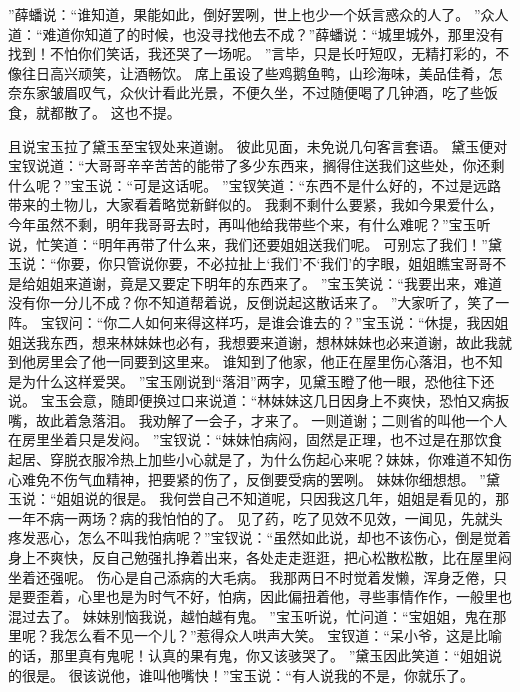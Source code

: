 ”薛蟠说：“谁知道，果能如此，倒好罢咧，世上也少一个妖言惑众的人了。
”众人道：“难道你知道了的时候，也没寻找他去不成？”薛蟠说：“城里城外，那里没有找到！不怕你们笑话，我还哭了一场呢。
”言毕，只是长吁短叹，无精打彩的，不像往日高兴顽笑，让酒畅饮。
席上虽设了些鸡鹅鱼鸭，山珍海味，美品佳肴，怎奈东家皱眉叹气，众伙计看此光景，不便久坐，不过随便喝了几钟酒，吃了些饭食，就都散了。
这也不提。
\par
且说宝玉拉了黛玉至宝钗处来道谢。
彼此见面，未免说几句客言套语。
黛玉便对宝钗说道：“大哥哥辛辛苦苦的能带了多少东西来，搁得住送我们这些处，你还剩什么呢？”宝玉说：“可是这话呢。
”宝钗笑道：“东西不是什么好的，不过是远路带来的土物儿，大家看着略觉新鲜似的。
我剩不剩什么要紧，我如今果爱什么，今年虽然不剩，明年我哥哥去时，再叫他给我带些个来，有什么难呢？”宝玉听说，忙笑道：“明年再带了什么来，我们还要姐姐送我们呢。
可别忘了我们！”黛玉说：“你要，你只管说你要，不必拉扯上‘我们’不‘我们’的字眼，姐姐瞧宝哥哥不是给姐姐来道谢，竟是又要定下明年的东西来了。
”宝玉笑说：“我要出来，难道没有你一分儿不成？你不知道帮着说，反倒说起这散话来了。
”大家听了，笑了一阵。
宝钗问：“你二人如何来得这样巧，是谁会谁去的？”宝玉说：“休提，我因姐姐送我东西，想来林妹妹也必有，我想要来道谢，想林妹妹也必来道谢，故此我就到他房里会了他一同要到这里来。
谁知到了他家，他正在屋里伤心落泪，也不知是为什么这样爱哭。
”宝玉刚说到“落泪”两字，见黛玉瞪了他一眼，恐他往下还说。
宝玉会意，随即便换过口来说道：“林妹妹这几日因身上不爽快，恐怕又病扳嘴，故此着急落泪。
我劝解了一会子，才来了。
一则道谢；二则省的叫他一个人在房里坐着只是发闷。
”宝钗说：“妹妹怕病闷，固然是正理，也不过是在那饮食起居、穿脱衣服冷热上加些小心就是了，为什么伤起心来呢？妹妹，你难道不知伤心难免不伤气血精神，把要紧的伤了，反倒要受病的罢咧。
妹妹你细想想。
”黛玉说：“姐姐说的很是。
我何尝自己不知道呢，只因我这几年，姐姐是看见的，那一年不病一两场？病的我怕怕的了。
见了药，吃了见效不见效，一闻见，先就头疼发恶心，怎么不叫我怕病呢？”宝钗说：“虽然如此说，却也不该伤心，倒是觉着身上不爽快，反自己勉强扎挣着出来，各处走走逛逛，把心松散松散，比在屋里闷坐着还强呢。
伤心是自己添病的大毛病。
我那两日不时觉着发懒，浑身乏倦，只是要歪着，心里也是为时气不好，怕病，因此偏扭着他，寻些事情作作，一般里也混过去了。
妹妹别恼我说，越怕越有鬼。
”宝玉听说，忙问道：“宝姐姐，鬼在那里呢？我怎么看不见一个儿？”惹得众人哄声大笑。
宝钗道：“呆小爷，这是比喻的话，那里真有鬼呢！认真的果有鬼，你又该骇哭了。
”黛玉因此笑道：“姐姐说的很是。
很该说他，谁叫他嘴快！”宝玉说：“有人说我的不是，你就乐了。
